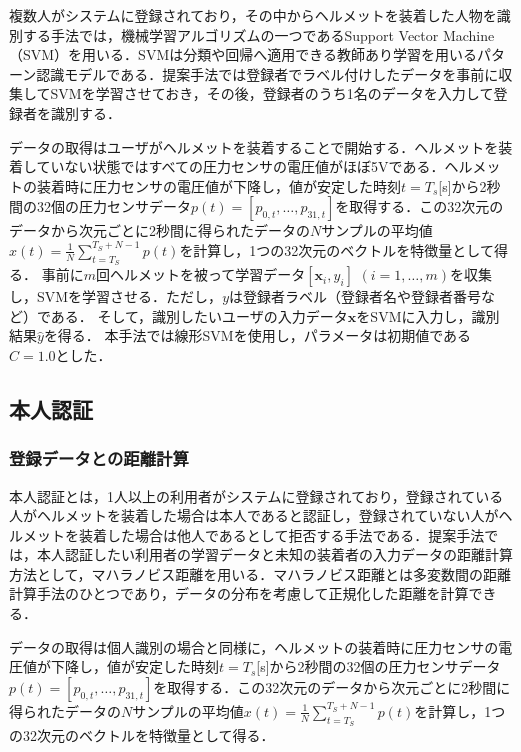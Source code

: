 \documentclass[Japanese,noauthor]{dicomopapers}
\begin{document}
複数人がシステムに登録されており，その中からヘルメットを装着した人物を識別する手法では，機械学習アルゴリズムの一つであるSupport Vector Machine（SVM）を用いる．SVMは分類や回帰へ適用できる教師あり学習を用いるパターン認識モデルである．提案手法では登録者でラベル付けしたデータを事前に収集してSVMを学習させておき，その後，登録者のうち1名のデータを入力して登録者を識別する．

データの取得はユーザがヘルメットを装着することで開始する．ヘルメットを装着していない状態ではすべての圧力センサの電圧値がほぼ5Vである．ヘルメットの装着時に圧力センサの電圧値が下降し，値が安定した時刻$t=T_s$[s]から2秒間の32個の圧力センサデータ$p(t)=[p_{0,t},\dots,p_{31,t}]$を取得する．この32次元のデータから次元ごとに2秒間に得られたデータの$N$サンプルの平均値$x(t)=\frac{1}{N}\sum_{t=T_S}^{T_S+N-1}p(t)$を計算し，1つの32次元のベクトルを特徴量として得る．
事前に$m$回ヘルメットを被って学習データ$[\bm{x}_i,y_i]$ $(i=1,\dots, m)$を収集し，SVMを学習させる．ただし，$y$は登録者ラベル（登録者名や登録者番号など）である．
そして，識別したいユーザの入力データ$\bm{x}$をSVMに入力し，識別結果$\hat{y}$を得る．
本手法では線形SVMを使用し，パラメータは初期値である$C=1.0$とした．

\subsection{本人認証}
\subsubsection{登録データとの距離計算}
本人認証とは，1人以上の利用者がシステムに登録されており，登録されている人がヘルメットを装着した場合は本人であると認証し，登録されていない人がヘルメットを装着した場合は他人であるとして拒否する手法である．提案手法では，本人認証したい利用者の学習データと未知の装着者の入力データの距離計算方法として，マハラノビス距離を用いる．マハラノビス距離とは多変数間の距離計算手法のひとつであり，データの分布を考慮して正規化した距離を計算できる．

データの取得は個人識別の場合と同様に，ヘルメットの装着時に圧力センサの電圧値が下降し，値が安定した時刻$t=T_s$[s]から2秒間の32個の圧力センサデータ$p(t)=[p_{0,t},\dots,p_{31,t}]$を取得する．この32次元のデータから次元ごとに2秒間に得られたデータの$N$サンプルの平均値$x(t)=\frac{1}{N}\sum_{t=T_S}^{T_S+N-1}p(t)$を計算し，1つの32次元のベクトルを特徴量として得る．
\end{document}
